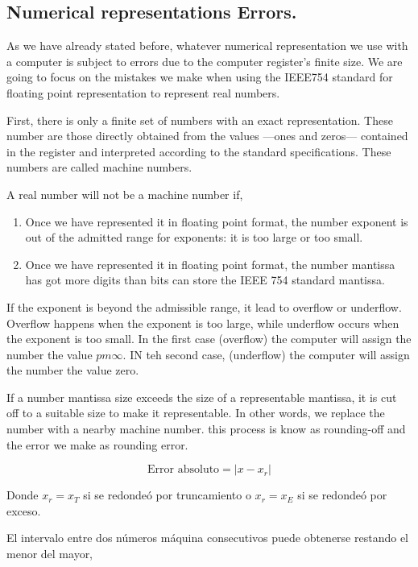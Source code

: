\begin{paracol}{2}
\section{Numerical representations Errors.}
As we have already stated before, whatever numerical representation we use with a computer is subject to errors due to the computer register's finite size. We are going to focus on the mistakes we make when using the IEEE754 standard for floating point representation to represent real numbers.

First, there is only a finite set of numbers with an exact representation. These number are those directly obtained from the values ---ones and zeros---  contained in the register and interpreted according to the standard specifications. These numbers are called machine numbers.

A real number will not be a machine number if,
\begin{enumerate}
	\item Once we have represented it in floating point format, the number exponent is out of the admitted range for exponents: it is too large or too small.
	\item Once we have represented it in floating point format, the number mantissa has got more digits than bits can store the IEEE 754 standard mantissa.	  
\end{enumerate}
If the exponent is beyond the admissible range, it lead to overflow or underflow. Overflow happens when the exponent is too large, while underflow occurs when the exponent is too small. In the first case (overflow) the computer will assign the number the value $pm \infty$. IN teh second case, (underflow) the computer will assign the number the value zero.  

If a number mantissa size exceeds the size of a representable mantissa, it is cut off to a suitable size to make it representable. In other words, we replace the number with a nearby machine number. this process is know as rounding-off and the error we make as rounding error.  
\end{paracol}
\begin{equation*}
\text{Error absoluto}=\vert x-x_r\vert
\end{equation*}

\begin{paracol}{2}
Donde $x_r=x_T$ si se redondeó por truncamiento o $x_r=x_E$ si se redondeó por exceso.

El intervalo entre dos números máquina consecutivos puede obtenerse restando el menor del mayor,
\end{paracol}

